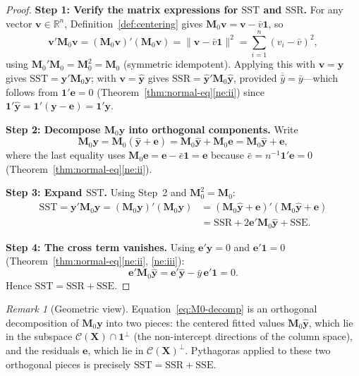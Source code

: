 \documentclass[14pt]{extarticle}
\theoremstyle{plain}
\theoremstyle{definition}
\theoremstyle{remark}
\newtheorem{remark}[theorem]{Remark}
\newcommand{\SST}{\mathrm{SST}}
\newcommand{\SSR}{\mathrm{SSR}}
\newcommand{\SSE}{\mathrm{SSE}}
\newcommand{\bX}{\mathbf{X}}
\newcommand{\by}{\mathbf{y}}
\newcommand{\bM}{\mathbf{M}}
\newcommand{\bone}{\mathbf{1}}
\newcommand{\bv}{\mathbf{v}}
\newcommand{\Real}{\mathbb{R}}
\newcommand{\calC}{\mathcal{C}}
\begin{document}
\begin{proof}
\textbf{Step 1: Verify the matrix expressions for $\SST$ and $\SSR$.} For any vector $\bv \in \Real^n$, Definition~\ref{def:centering} gives $\bM_0\bv = \bv - \bar{v}\bone$, so
\[
\bv'\bM_0\bv = (\bM_0\bv)'(\bM_0\bv) = \|\bv - \bar{v}\bone\|^2 = \sum_{i=1}^n (v_i - \bar{v})^2,
\]
using $\bM_0'\bM_0 = \bM_0^2 = \bM_0$ (symmetric idempotent). Applying this with $\bv = \by$ gives $\SST = \by'\bM_0\by$; with $\bv = \hat{\by}$ gives $\SSR = \hat{\by}'\bM_0\hat{\by}$, provided $\overline{\hat{y}} = \bar{y}$—which follows from $\bone'\mathbf{e} = 0$ (Theorem~\ref{thm:normal-eq}\ref{ne:ii}) since $\bone'\hat{\by} = \bone'(\by - \mathbf{e}) = \bone'\by$.

\textbf{Step 2: Decompose $\bM_0\by$ into orthogonal components.} Write
\begin{equation}\label{eq:M0-decomp}
\bM_0\by = \bM_0(\hat{\by} + \mathbf{e}) = \bM_0\hat{\by} + \bM_0\mathbf{e} = \bM_0\hat{\by} + \mathbf{e},
\end{equation}
where the last equality uses $\bM_0\mathbf{e} = \mathbf{e} - \bar{e}\bone = \mathbf{e}$ because $\bar{e} = n^{-1}\bone'\mathbf{e} = 0$ (Theorem~\ref{thm:normal-eq}\ref{ne:ii}).

\textbf{Step 3: Expand $\SST$.} Using Step~2 and $\bM_0^2 = \bM_0$:
\begin{align*}
\SST = \by'\bM_0\by = (\bM_0\by)'(\bM_0\by) &= (\bM_0\hat{\by} + \mathbf{e})'(\bM_0\hat{\by} + \mathbf{e})\\
&= \SSR + 2\mathbf{e}'\bM_0\hat{\by} + \SSE.
\end{align*}

\textbf{Step 4: The cross term vanishes.} Using $\mathbf{e}'\hat{\by} = 0$ and $\mathbf{e}'\bone = 0$ (Theorem~\ref{thm:normal-eq}\ref{ne:ii}, \ref{ne:iii}):
\[
\mathbf{e}'\bM_0\hat{\by} = \mathbf{e}'\hat{\by} - \bar{y}\,\mathbf{e}'\bone = 0.
\]
Hence $\SST = \SSR + \SSE$.
\end{proof}

\begin{remark}[Geometric view]\label{rem:geometric}
Equation~\eqref{eq:M0-decomp} is an orthogonal decomposition of $\bM_0\by$ into two pieces: the centered fitted values $\bM_0\hat{\by}$, which lie in the subspace $\calC(\bX) \cap \bone^\perp$ (the non-intercept directions of the column space), and the residuals $\mathbf{e}$, which lie in $\calC(\bX)^\perp$. Pythagoras applied to these two orthogonal pieces is precisely $\SST = \SSR + \SSE$.
\end{remark}
\end{document}
